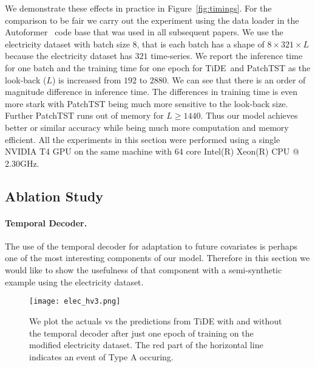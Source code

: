 \documentclass[10pt]{article} \usepackage[accepted]{tmlr}
\theoremstyle{plain}
\theoremstyle{definition}
\theoremstyle{remark}
\newcommand{\ours}{TiDE}
\begin{document}
We demonstrate these effects in practice in Figure~\ref{fig:timings}. 
For the comparison to be fair we carry out the experiment using the data loader in the Autoformer~\citep{wu2021autoformer} code base that was used in all subsequent papers. We use the electricity dataset with batch size $8$, that is each batch has a shape of $8 \times 321 \times L$ because the electricity dataset has $321$ time-series. We report the inference time for one batch and the training time for one epoch for \ours~and PatchTST as the look-back ($L$) is increased from $192$ to $2880$. We can see that there is an order of magnitude difference in inference time. The differences in training time is even more stark with PatchTST being much more sensitive to the look-back size. Further PatchTST runs out of memory for $L \geq 1440$. Thus our model achieves better or similar accuracy while being much more computation and memory efficient. All the experiments in this section were performed using a single NVIDIA T4 GPU on the same machine with 64 core Intel(R) Xeon(R) CPU @ 2.30GHz.

\subsection{Ablation Study}
\label{sec:ablation}
\paragraph{Temporal Decoder.} The use of the temporal decoder for adaptation to future covariates is perhaps one of the most interesting components of our model. Therefore in this section we would like to show the usefulness of that component with a semi-synthetic example using the electricity dataset.

\begin{figure}[h]
    \centering
    \texttt{[image: elec\_hv3.png]}
    \caption{We plot the actuals vs the predictions from TiDE with and without the temporal decoder after just one epoch of training on the modified electricity dataset. The red part of the horizontal line indicates an event of Type A occuring.}
    \label{fig:ablation}
\end{figure}
\end{document}
